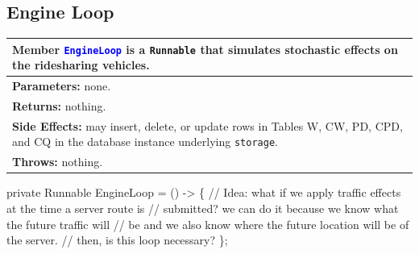 \subsection{Engine Loop}
\begin{tabular}{p{\textwidth}}
\toprule
\rowcolor{TableTitle}
Member \textcolor{blue}{{\tt{}EngineLoop}} is a {\tt{}Runnable} that simulates
stochastic effects on the ridesharing vehicles.\\
\midrule
\textbf{Parameters:} none.\\
\textbf{Returns:} nothing.\\
\textbf{Side Effects:} may insert, delete, or update rows in Tables W, CW,
PD, CPD, and CQ in the database instance underlying {\tt{}storage}.\\
\textbf{Throws:} nothing.\\
\bottomrule
\end{tabular}
\nwenddocs{}\endmoddef{}
private Runnable EngineLoop = () -> \{
  // Idea: what if we apply traffic effects at the time a server route is
  // submitted? we can do it because we know what the future traffic will
  // be and we also know where the future location will be of the server.
  // then, is this loop necessary?
\};
\nwendcode{}\nwdocspar

